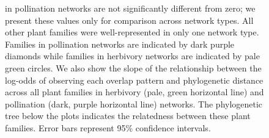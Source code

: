 \documentclass[12pt]{article}
\providecommand{\DIFdelendFL}{} %
\DeclareRobustCommand{\DIFdelendFL}{\DIFOaddendFL \let\includegraphics\DIFOincludegraphics} %
\begin{document}
\begin{figure}[!h]
{\DIFdelendFL in pollination networks are not significantly different from zero; we present these values only for comparison across network types. All other plant families were well-represented in only one network type.
    Families in pollination networks are indicated
    by dark purple diamonds while families in herbivory
    networks are indicated by pale green circles.
    We also
    show the slope of the relationship between the
    log-odds of observing each overlap pattern and 
    phylogenetic distance across all plant families
    in herbivory (pale, green horizontal line) and
    pollination (dark, purple horizontal line) networks.
    The phylogenetic tree below the plots indicates the
    relatedness between these plant families. Error bars represent 95\% 
    confidence intervals.}
    \label{within_family_regression}
  \end{figure}
\end{document}
